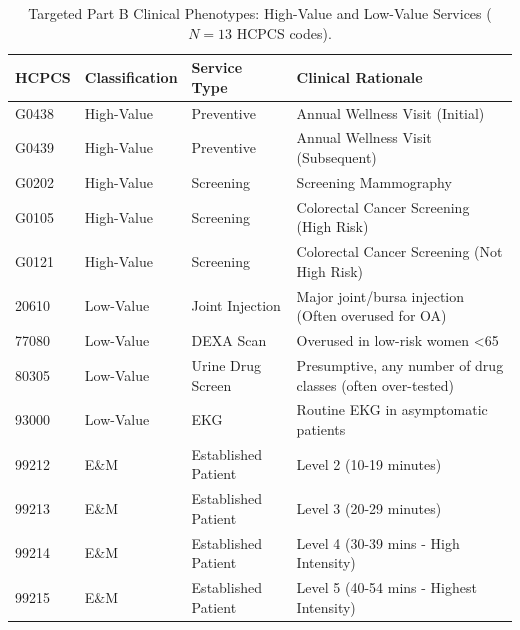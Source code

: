 \begin{table}[htbp]
\caption{Targeted Part B Clinical Phenotypes: High-Value and Low-Value Services ($N=13$ HCPCS codes).}
\label{tab:services}
\begin{tabular}{llp{3cm}p{4cm}}
\toprule
\rowcolor{gray!10}
HCPCS & Classification & Service Type & Clinical Rationale \\
\midrule
G0438 & High-Value & Preventive & Annual Wellness Visit (Initial) \\
G0439 & High-Value & Preventive & Annual Wellness Visit (Subsequent) \\
G0202 & High-Value & Screening & Screening Mammography \\
G0105 & High-Value & Screening & Colorectal Cancer Screening (High Risk) \\
G0121 & High-Value & Screening & Colorectal Cancer Screening (Not High Risk) \\
20610 & Low-Value & Joint Injection & Major joint/bursa injection (Often overused for OA) \\
77080 & Low-Value & DEXA Scan & Overused in low-risk women <65 \\
80305 & Low-Value & Urine Drug Screen & Presumptive, any number of drug classes (often over-tested) \\
93000 & Low-Value & EKG & Routine EKG in asymptomatic patients \\
99212 & E\&M & Established Patient & Level 2 (10-19 minutes) \\
99213 & E\&M & Established Patient & Level 3 (20-29 minutes) \\
99214 & E\&M & Established Patient & Level 4 (30-39 mins - High Intensity) \\
99215 & E\&M & Established Patient & Level 5 (40-54 mins - Highest Intensity) \\
\bottomrule
\end{tabular}
\end{table}
